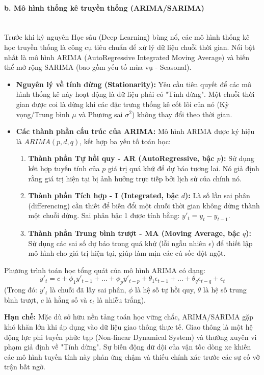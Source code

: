 \paragraph{b. Mô hình thống kê truyền thống (ARIMA/SARIMA)} \mbox{} \\
Trước khi kỷ nguyên Học sâu (Deep Learning) bùng nổ, các mô hình thống kê học truyền thống là công cụ tiêu chuẩn để xử lý dữ liệu chuỗi thời gian. Nổi bật nhất là mô hình ARIMA (AutoRegressive Integrated Moving Average) và biến thể mở rộng SARIMA (bao gồm yếu tố mùa vụ - Seasonal).
\begin{itemize}
    \item \textbf{Nguyên lý về tính dừng (Stationarity):} Yêu cầu tiên quyết để các mô hình thống kê này hoạt động là dữ liệu phải có "Tính dừng". Một chuỗi thời gian được coi là dừng khi các đặc trưng thống kê cốt lõi của nó (Kỳ vọng/Trung bình $\mu$ và Phương sai $\sigma^2$) không thay đổi theo thời gian.
    \item \textbf{Các thành phần cấu trúc của ARIMA:} Mô hình ARIMA được ký hiệu là $ARIMA(p, d, q)$, kết hợp ba yếu tố toán học:
    \begin{enumerate}
        \item \textbf{Thành phần Tự hồi quy - AR (AutoRegressive, bậc $p$):} Sử dụng kết hợp tuyến tính của $p$ giá trị quá khứ để dự báo tương lai. Nó giả định rằng giá trị hiện tại bị ảnh hưởng trực tiếp bởi lịch sử của chính nó.
        \item \textbf{Thành phần Tích hợp - I (Integrated, bậc $d$):} Là số lần sai phân (differencing) cần thiết để biến đổi một chuỗi thời gian không dừng thành một chuỗi dừng. Sai phân bậc 1 được tính bằng: $y'_t = y_t - y_{t-1}$.
        \item \textbf{Thành phần Trung bình trượt - MA (Moving Average, bậc $q$):} Sử dụng các sai số dự báo trong quá khứ (lỗi ngẫu nhiên $\epsilon$) để thiết lập mô hình cho giá trị hiện tại, giúp làm mịn các cú sốc đột ngột.
    \end{enumerate}
\end{itemize}
Phương trình toán học tổng quát của mô hình ARIMA có dạng:
$$y'_t = c + \phi_1 y'_{t-1} + \dots + \phi_p y'_{t-p} + \theta_1 \epsilon_{t-1} + \dots + \theta_q \epsilon_{t-q} + \epsilon_t$$
(Trong đó: $y'_t$ là chuỗi đã lấy sai phân, $\phi$ là hệ số tự hồi quy, $\theta$ là hệ số trung bình trượt, $c$ là hằng số và $\epsilon_t$ là nhiễu trắng).

\textbf{Hạn chế:} Mặc dù sở hữu nền tảng toán học vững chắc, ARIMA/SARIMA gặp khó khăn lớn khi áp dụng vào dữ liệu giao thông thực tế. Giao thông là một hệ động lực phi tuyến phức tạp (Non-linear Dynamical System) và thường xuyên vi phạm giả định về "Tính dừng". Sự biến động dữ dội của vận tốc dòng xe khiến các mô hình tuyến tính này phản ứng chậm và thiếu chính xác trước các sự cố vỡ trận bất ngờ.


